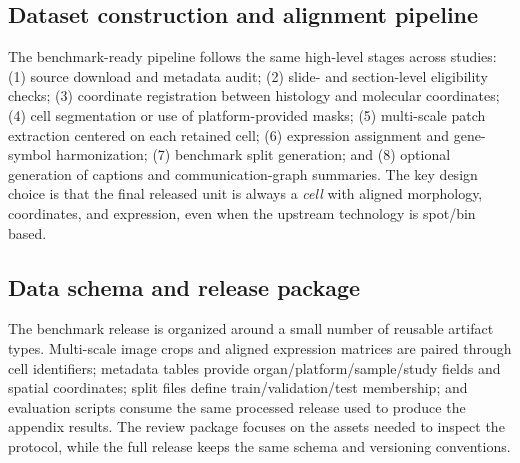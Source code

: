 \documentclass[sigconf,review]{acmart}
\begin{document}
\subsection{Dataset construction and alignment pipeline}
\label{sec:construction_alignment}
The benchmark-ready pipeline follows the same high-level stages across studies: (1) source download and metadata audit; (2) slide- and section-level eligibility checks; (3) coordinate registration between histology and molecular coordinates; (4) cell segmentation or use of platform-provided masks; (5) multi-scale patch extraction centered on each retained cell; (6) expression assignment and gene-symbol harmonization; (7) benchmark split generation; and (8) optional generation of captions and communication-graph summaries. The key design choice is that the final released unit is always a \emph{cell} with aligned morphology, coordinates, and expression, even when the upstream technology is spot/bin based.

\FloatBarrier

\subsection{Data schema and release package}
\label{sec:release_schema}
The benchmark release is organized around a small number of reusable artifact types. Multi-scale image crops and aligned expression matrices are paired through cell identifiers; metadata tables provide organ/platform/sample/study fields and spatial coordinates; split files define train/validation/test membership; and evaluation scripts consume the same processed release used to produce the appendix results. The review package focuses on the assets needed to inspect the protocol, while the full release keeps the same schema and versioning conventions.
\end{document}
